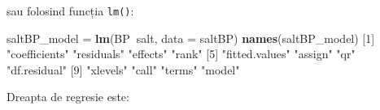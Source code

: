 \documentclass[]{article}
\newenvironment{Shaded}{\begin{snugshade}}{\end{snugshade}}
\newcommand{\KeywordTok}[1]{\textcolor[rgb]{0.13,0.29,0.53}{\textbf{#1}}}
\newcommand{\DataTypeTok}[1]{\textcolor[rgb]{0.13,0.29,0.53}{#1}}
\newcommand{\DecValTok}[1]{\textcolor[rgb]{0.00,0.00,0.81}{#1}}
\newcommand{\FloatTok}[1]{\textcolor[rgb]{0.00,0.00,0.81}{#1}}
\newcommand{\StringTok}[1]{\textcolor[rgb]{0.31,0.60,0.02}{#1}}
\newcommand{\OperatorTok}[1]{\textcolor[rgb]{0.81,0.36,0.00}{\textbf{#1}}}
\newcommand{\NormalTok}[1]{#1}
\begin{document}
sau folosind funcția \texttt{lm()}:

\begin{Shaded}
\begin{Highlighting}[]
\NormalTok{saltBP_model =}\StringTok{ }\KeywordTok{lm}\NormalTok{(BP}\OperatorTok{~}\NormalTok{salt, }\DataTypeTok{data =}\NormalTok{ saltBP)}
\KeywordTok{names}\NormalTok{(saltBP_model)}
\NormalTok{ [}\DecValTok{1}\NormalTok{] }\StringTok{"coefficients"}  \StringTok{"residuals"}     \StringTok{"effects"}       \StringTok{"rank"}         
\NormalTok{ [}\DecValTok{5}\NormalTok{] }\StringTok{"fitted.values"} \StringTok{"assign"}        \StringTok{"qr"}            \StringTok{"df.residual"}  
\NormalTok{ [}\DecValTok{9}\NormalTok{] }\StringTok{"xlevels"}       \StringTok{"call"}          \StringTok{"terms"}         \StringTok{"model"}        
\end{Highlighting}
\end{Shaded}

\begin{Shaded}
\end{Shaded}

Dreapta de regresie este:
\end{document}
